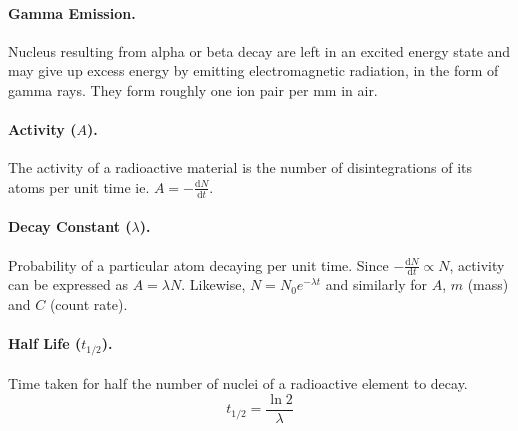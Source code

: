 \documentclass{article}
\begin{document}
\paragraph{Gamma Emission.} Nucleus resulting from alpha or beta decay are left in an excited energy state and may give up excess energy by emitting electromagnetic radiation, in the form of gamma rays. They form roughly one ion pair per mm in air.

\paragraph{Activity ($A$).} The activity of a radioactive material is the number of disintegrations of its atoms per unit time ie. $A = -\frac{\mathrm{d}N}{\mathrm{d}t}$.

\paragraph{Decay Constant ($\lambda$).} Probability of a particular atom decaying per unit time. Since $-\frac{\mathrm{d}N}{\mathrm{d}t} \propto N$, activity can be expressed as $A = \lambda N$. Likewise, $N = N_0e^{-\lambda t}$ and similarly for $A$, $m$ (mass) and $C$ (count rate).

\paragraph{Half Life ($t_{1/2}$).} Time taken for half the number of nuclei of a radioactive element to decay. \begin{equation}
t_{1/2} = \frac{\ln 2}{\lambda}
\end{equation}
\end{document}

